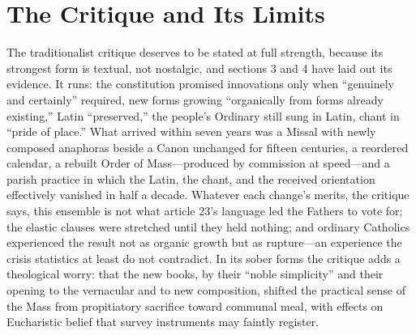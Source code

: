 \section{The Critique and Its Limits}

The traditionalist critique deserves to be stated at full strength, because its strongest form is textual, not nostalgic, and sections 3 and 4 have laid out its evidence. It runs: the constitution promised innovations only when ``genuinely and certainly'' required, new forms growing ``organically from forms already existing,'' Latin ``preserved,'' the people's Ordinary still sung in Latin, chant in ``pride of place.'' What arrived within seven years was a Missal with newly composed anaphoras beside a Canon unchanged for fifteen centuries, a reordered calendar, a rebuilt Order of Mass---produced by commission at speed---and a parish practice in which the Latin, the chant, and the received orientation effectively vanished in half a decade. Whatever each change's merits, the critique says, this ensemble is not what article 23's language led the Fathers to vote for; the elastic clauses were stretched until they held nothing; and ordinary Catholics experienced the result not as organic growth but as rupture---an experience the crisis statistics at least do not contradict. In its sober forms the critique adds a theological worry: that the new books, by their ``noble simplicity'' and their opening to the vernacular and to new composition, shifted the practical sense of the Mass from propitiatory sacrifice toward communal meal, with effects on Eucharistic belief that survey instruments may faintly register.

